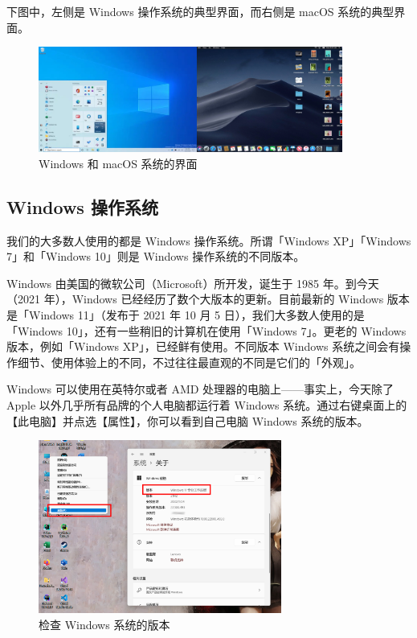 下图中，左侧是 Windows 操作系统的典型界面，而右侧是 macOS 系统的典型界面。

\begin{figure}[H]
  \centering
  \includegraphics[width=10cm]{assets/Windows_and_macOS.png}
  \caption{Windows 和 macOS 系统的界面}
  \label{win-and-mac}
\end{figure}

\subsection{Windows 操作系统}

我们的大多数人使用的都是 Windows 操作系统。所谓「Windows XP」「Windows 7」和「Windows 10」则是 Windows 操作系统的不同版本。

Windows 由美国的微软公司（Microsoft）所开发，诞生于 1985 年。到今天（2021 年），Windows 已经经历了数个大版本的更新。目前最新的 Windows 版本是「Windows 11」（发布于 2021 年 10 月 5 日），我们大多数人使用的是「Windows 10」，还有一些稍旧的计算机在使用「Windows 7」。更老的 Windows 版本，例如「Windows XP」，已经鲜有使用。不同版本 Windows 系统之间会有操作细节、使用体验上的不同，不过往往最直观的不同是它们的「外观」。

Windows 可以使用在英特尔或者 AMD 处理器的电脑上——事实上，今天除了 Apple 以外几乎所有品牌的个人电脑都运行着 Windows 系统。通过右键桌面上的【此电脑】并点选【属性】，你可以看到自己电脑 Windows 系统的版本。

\begin{figure}[H]
  \centering
  \includegraphics[width=8cm]{assets/Check_Windows_version.png}
  \caption{检查 Windows 系统的版本}
  \label{check-windows-version}
\end{figure}

